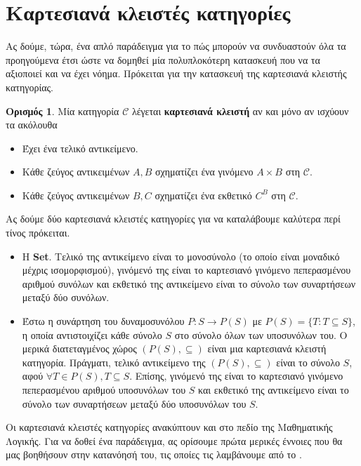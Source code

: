 \documentclass [a4paper,11pt] {book}
\theoremstyle{definition}
\theoremstyle{definition}
\newtheorem{definition}[theorem]{Ορισμός}
\begin{document}
\section{Καρτεσιανά κλειστές κατηγορίες}
\label{CartesianClosedCategories}
Ας δούμε, τώρα, ένα απλό παράδειγμα για το πώς μπορούν να συνδυαστούν όλα τα προηγούμενα έτσι ώστε να δομηθεί μία πολυπλοκότερη κατασκευή που να τα αξιοποιεί και να έχει νόημα. Πρόκειται για την κατασκευή της καρτεσιανά κλειστής κατηγορίας.
\begin{definition}\label{cartesianClosedCategory}
Μία κατηγορία $\mathcal{C}$ λέγεται \textbf{καρτεσιανά κλειστή} αν και μόνο αν ισχύουν τα ακόλουθα
\begin{itemize}
\item Έχει ένα τελικό αντικείμενο.
\item Κάθε ζεύγος αντικειμένων $A,B$ σχηματίζει ένα γινόμενο $A\times B$ στη $\mathcal{C}$.
\item Κάθε ζεύγος αντικειμένων $B,C$ σχηματίζει ένα εκθετικό $C^{B}$ στη $\mathcal{C}$.
\end{itemize}
\end{definition}
Ας δούμε δύο καρτεσιανά κλειστές κατηγορίες για να καταλάβουμε καλύτερα περί τίνος πρόκειται.
\begin{itemize}
\item Η \textbf{Set}. Τελικό της αντικείμενο είναι το μονοσύνολο (το οποίο είναι μοναδικό μέχρις ισομορφισμού), γινόμενό της είναι το καρτεσιανό γινόμενο πεπερασμένου αριθμού συνόλων και εκθετικό της αντικείμενο είναι το σύνολο των συναρτήσεων μεταξύ δύο συνόλων.
\item Έστω η συνάρτηση του δυναμοσυνόλου $P:S \to P(S) $ με $P(S)= \lbrace T : T \subseteq S \rbrace $, η οποία αντιστοιχίζει κάθε σύνολο $S$ στο σύνολο όλων των υποσυνόλων του. Ο μερικά διατεταγμένος χώρος \textbf{$(P(S),\subseteq )$} είναι μια καρτεσιανά κλειστή κατηγορία. Πράγματι, τελικό αντικείμενο της \textbf{$(P(S),\subseteq)$} είναι το σύνολο $S$, αφού $\forall T\in P(S), T\subseteq S$. Επίσης, γινόμενό της είναι το καρτεσιανό γινόμενο πεπερασμένου αριθμού υποσυνόλων του $S$ και εκθετικό της αντικείμενο είναι το σύνολο των συναρτήσεων μεταξύ δύο υποσυνόλων του $S$.
\end{itemize}
Οι καρτεσιανά κλειστές κατηγορίες ανακύπτουν και στο πεδίο της Μαθηματικής Λογικής. Για να δοθεί ένα παράδειγμα, ας ορίσουμε πρώτα μερικές έννοιες που θα μας βοηθήσουν στην κατανόησή του, τις οποίες τις λαμβάνουμε από το \citep{coletsos}.
\end{document}

